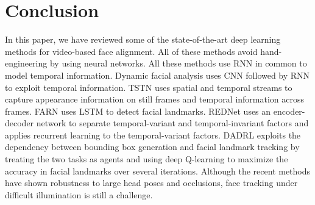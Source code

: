 \documentclass{llncs}
\begin{document}
	\section{Conclusion}
	
	In this paper, we have reviewed some of the state-of-the-art deep learning methods for video-based face alignment. All of these methods avoid hand-engineering by using neural networks. All these methods use RNN in common to model temporal information. Dynamic facial analysis\cite{dynamic_facial_analysis} uses CNN followed by RNN to exploit temporal information. TSTN\cite{tstn} uses spatial and temporal streams to capture appearance information on still frames and temporal information across frames. FARN\cite{farn} uses LSTM to detect facial landmarks. REDNet\cite{rednet} uses an encoder-decoder network to separate temporal-variant and temporal-invariant factors and applies recurrent learning to the temporal-variant factors. DADRL \cite{dadrl} exploits the dependency between bounding box generation and facial landmark tracking by treating the two tasks as agents and using deep Q-learning to maximize the accuracy in facial landmarks over several iterations. Although the recent methods have shown robustness to large head poses and occlusions, face tracking under difficult illumination is still a challenge.
	
	
	
	
\end{document}
